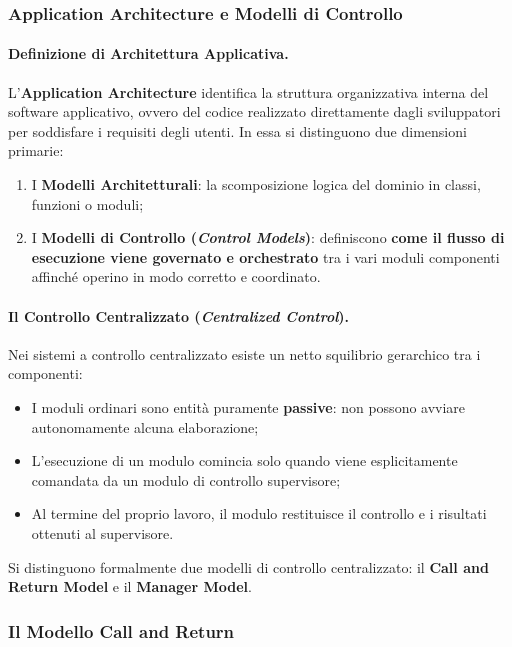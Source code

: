 \documentclass[12pt]{extarticle}
\begin{document}
\subsubsection{Application Architecture e Modelli di Controllo}

\paragraph{Definizione di Architettura Applicativa.}
L'\textbf{Application Architecture} identifica la struttura organizzativa interna del software applicativo, ovvero del codice realizzato direttamente dagli sviluppatori per soddisfare i requisiti degli utenti.
In essa si distinguono due dimensioni primarie:
\begin{enumerate}
    \item I \textbf{Modelli Architetturali}: la scomposizione logica del dominio in classi, funzioni o moduli;
    \item I \textbf{Modelli di Controllo (\textit{Control Models})}: definiscono \textbf{come il flusso di esecuzione viene governato e orchestrato} tra i vari moduli componenti affinché operino in modo corretto e coordinato.
\end{enumerate}

\paragraph{Il Controllo Centralizzato (\textit{Centralized Control}).}
Nei sistemi a controllo centralizzato esiste un netto squilibrio gerarchico tra i componenti:
\begin{itemize}
    \item I moduli ordinari sono entità puramente \textbf{passive}: non possono avviare autonomamente alcuna elaborazione;
    \item L'esecuzione di un modulo comincia solo quando viene esplicitamente comandata da un modulo di controllo supervisore;
    \item Al termine del proprio lavoro, il modulo restituisce il controllo e i risultati ottenuti al supervisore.
\end{itemize}

\noindent Si distinguono formalmente due modelli di controllo centralizzato: il \textbf{Call and Return Model} e il \textbf{Manager Model}.

\subsubsection{Il Modello Call and Return}
\end{document}
